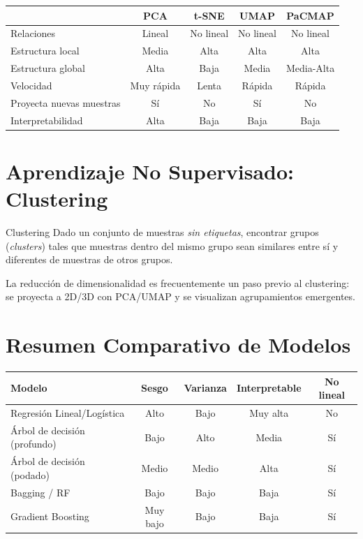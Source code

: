\documentclass[12pt, a4paper]{article}
\begin{document}
\begin{center}
\begin{tabular}{lcccc}
\toprule
& \textbf{PCA} & \textbf{t-SNE} & \textbf{UMAP} & \textbf{PaCMAP} \\
\midrule
Relaciones & Lineal & No lineal & No lineal & No lineal \\
Estructura local & Media & Alta & Alta & Alta \\
Estructura global & Alta & Baja & Media & Media-Alta \\
Velocidad & Muy rápida & Lenta & Rápida & Rápida \\
Proyecta nuevas muestras & Sí & No & Sí & No \\
Interpretabilidad & Alta & Baja & Baja & Baja \\
\bottomrule
\end{tabular}
\end{center}

\section{Aprendizaje No Supervisado: Clustering}

\begin{defbox}{Clustering}
  Dado un conjunto de muestras \emph{sin etiquetas}, encontrar grupos (\emph{clusters})
  tales que muestras dentro del mismo grupo sean similares entre sí y diferentes
  de muestras de otros grupos.
\end{defbox}

La reducción de dimensionalidad es frecuentemente un paso previo al clustering:
se proyecta a 2D/3D con PCA/UMAP y se visualizan agrupamientos emergentes.

\section{Resumen Comparativo de Modelos}

\begin{center}
\begin{tabular}{lcccc}
\toprule
\textbf{Modelo} & \textbf{Sesgo} & \textbf{Varianza} & \textbf{Interpretable} & \textbf{No lineal} \\
\midrule
Regresión Lineal/Logística  & Alto & Bajo  & Muy alta & No \\
Árbol de decisión (profundo)& Bajo & Alto  & Media & Sí \\
Árbol de decisión (podado)  & Medio& Medio & Alta & Sí \\
Bagging / RF                & Bajo & Bajo  & Baja & Sí \\
Gradient Boosting           & Muy bajo & Bajo & Baja & Sí \\
\bottomrule
\end{tabular}
\end{center}
\end{document}
